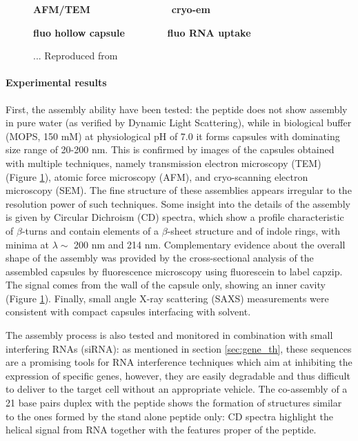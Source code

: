 \begin{figure}
\begin{center}
\textbf{AFM/TEM \ \ \ \ \ \ \ \ \ \ \ \ \ \ cryo-em}
\bigskip

\textbf{fluo hollow capsule \ \ \ \ \ \ \ fluo RNA uptake}
\caption[Experimental results on capzip]{... Reproduced from \cite{Castelletto2016}} \label{fig:exp_capzip}
\end{center}
\end{figure}

\paragraph{Experimental results} First, the assembly ability have been tested: the peptide does not show assembly in pure water (as verified by Dynamic Light Scattering), while in biological buffer (MOPS, 150 mM) at physiological pH of 7.0 it forms capsules with dominating size range of 20-200 nm. This is confirmed by images of the capsules obtained with multiple techniques, namely transmission electron microscopy (TEM) (Figure \ref{fig:exp_capzip}), atomic force microscopy (AFM), and cryo-scanning electron microscopy (SEM).
%
The fine structure of these assemblies appears irregular to the resolution power of such techniques. Some insight into the details of the assembly is given by Circular Dichroism (CD) spectra, which show a profile characteristic of $\beta$-turns and contain elements of a $\beta$-sheet structure and of indole rings, with minima at $\lambda \sim$ 200 nm and 214 nm.
%
Complementary evidence about the overall shape of the assembly was provided by the cross-sectional analysis of the assembled capsules by fluorescence microscopy using fluorescein to label capzip. The signal comes from the wall of the capsule only, showing an inner cavity (Figure \ref{fig:exp_capzip}).
%
Finally, small angle X-ray scattering (SAXS) measurements were consistent with compact capsules interfacing with solvent.

The assembly process is also tested and monitored in combination with small interfering RNAs (siRNA): as mentioned in section \ref{sec:gene_th}, these sequences are a promising tools for RNA interference techniques which aim at inhibiting the expression of specific genes, however, they are easily degradable and thus difficult to deliver to the target cell without an appropriate vehicle.
%
The co-assembly of a 21 base pairs duplex with the peptide shows the formation of structures similar to the ones formed by the stand alone peptide only: CD spectra highlight the helical signal from RNA together with the features proper of the peptide.

